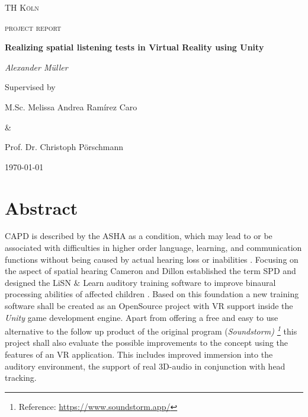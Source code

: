 \documentclass[a4paper,11pt]{article}%
\renewcommand{\\}{\vspace*{0.5\baselineskip} \newline}
\begin{document}

\begin{titlepage}
	\centering
	{\scshape\LARGE TH Köln \par}
	\vspace{1cm}
	{\scshape\Large project report\par}
	\vspace{1.5cm}
	{\huge\bfseries Realizing spatial listening tests in Virtual Reality using Unity\par}
	\vspace{2cm}
	{\Large\itshape Alexander Müller \par}
	\vfill
	Supervised by\par
	M.Sc. Melissa Andrea Ramírez Caro \par \&  \par Prof. Dr. Christoph Pörschmann
	\vfill

	{\large \today\par}
\end{titlepage}


\newpage

\tableofcontents
\newpage



\section{Abstract}
\ac{CAPD} is described by the \ac{ASHA} as a condition, which \dq may lead to or be associated with difficulties in higher order language, learning, and communication functions\dq{} without being caused by actual hearing loss or inabilities \cite{ASHA}. Focusing on the aspect of spatial hearing Cameron and Dillon established the term \ac{SPD} and designed the \ac{LiSN} $\&$ Learn auditory training software to improve binaural processing abilities of affected children \cite{LiSN-A}.
\newline
\newline
Based on this foundation a new training software shall be created as an OpenSource project with \ac{VR} support inside the \textit{Unity} game development engine. Apart from offering a free and easy to use alternative to the follow up product of the original program (\textit{Soundstorm) \footnote{Reference: \url{https://www.soundstorm.app/}}} this project shall also evaluate the possible improvements to the concept using the features of an \ac{VR} application. This includes improved immersion into the auditory environment, the support of real 3D-audio in conjunction with head tracking.
\end{document}
